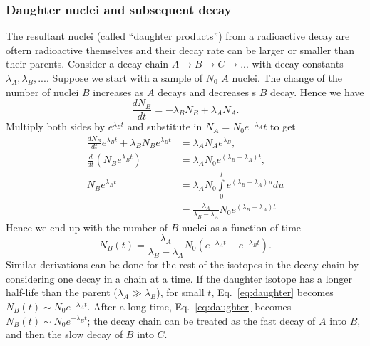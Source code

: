 \documentclass[nofootinbib,preprint,aps]{revtex4-1}
\begin{document}
        \subsubsection{Daughter nuclei and subsequent decay}
        The resultant nuclei (called ``daughter products'') from a radioactive decay are oftern radioactive
        themselves and their decay rate can be larger or smaller than their parents. Consider a decay chain
        $A\rightarrow B \rightarrow C \rightarrow ...$ with decay constants $\lambda_A, \lambda_B,...$. Suppose
        we start with a sample of $N_0$ $A$ nuclei. The change of the number of nuclei $B$ increases as $A$
        decays and decreases s $B$ decay. Hence we have
        \begin{equation}
            \frac{dN_B}{dt} = -\lambda_B N_B + \lambda_A N_A.
        \end{equation}
        Multiply both sides by $e^{\lambda_B t}$ and substitute in $N_A=N_0 e^{-\lambda_A} t$ to get
        \begin{align*}
            \frac{dN_B}{dt}e^{\lambda_B t} + \lambda_B N_B e^{\lambda_B t} &= \lambda_A N_A e^{\lambda_B},\nonumber\\
            \frac{d}{dt} (N_B e^{\lambda_B t}) &= \lambda_A N_0 e^{(\lambda_B-\lambda_A)t}, \nonumber\\
            N_B e^{\lambda_B t} &= \lambda_A N_0 \int\limits_0^t e^{(\lambda_B - \lambda_A)u} du \nonumber\\
                                &= \frac{\lambda_A}{\lambda_B-\lambda_A}N_0 e^{(\lambda_B - \lambda_A)t}
        \end{align*}
        Hence we end up with the number of $B$ nuclei as a function of time
        \begin{equation}
            N_B(t)=\frac{\lambda_A}{\lambda_B-\lambda_A}N_0(e^{-\lambda_A t} - e^{-\lambda_B t}).
            \label{eq:daughter}
        \end{equation}
        Similar derivations can be done for the rest of the isotopes in the decay chain by considering
        one decay in a chain at a time. If the daughter isotope has a longer half-life than the parent
        ($\lambda_A \gg \lambda_B$), for small $t$, Eq.~\ref{eq:daughter} becomes
        $N_B(t)\sim N_0 e^{-\lambda_A t}$. After a long time,
        Eq.~\ref{eq:daughter} becomes $N_B(t) \sim N_0 e^{-\lambda_B t}$; the decay
        chain can be treated as the fast decay of $A$ into $B$, and then the slow decay of $B$
        into $C$.
        
\end{document}
